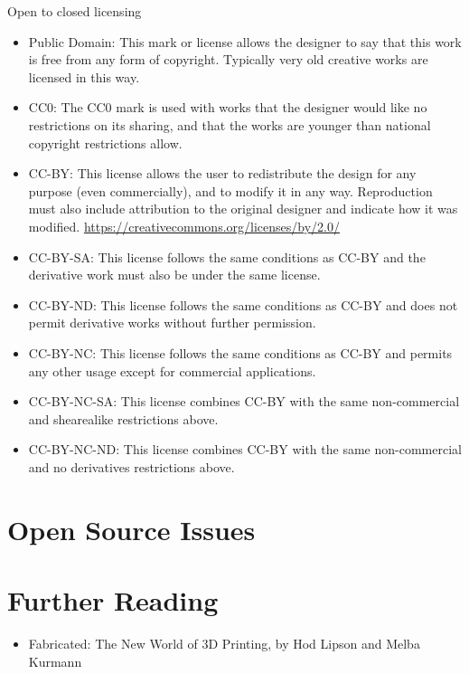 Open to closed licensing
\begin{itemize}
 \item Public Domain: This mark or license allows the designer to say that this work is free from any form of copyright. Typically very old creative works are licensed in this way.  
 \item CC0: The CC0 mark is used with works that the designer would like no restrictions on its sharing, and that the works are younger than national copyright restrictions allow. 
 \item CC-BY: This license allows the user to redistribute the design for any purpose (even commercially), and to modify it in any way. Reproduction must also include attribution to the original designer and indicate how it was modified.  \url{https://creativecommons.org/licenses/by/2.0/}
 \item CC-BY-SA: This license follows the same conditions as CC-BY and the derivative work must also be under the same license. 
 \item CC-BY-ND: This license follows the same conditions as CC-BY and does not permit derivative works without further permission. 
 \item CC-BY-NC: This license follows the same conditions as CC-BY and permits any other usage except for commercial applications. 
 \item CC-BY-NC-SA: This license combines CC-BY with the same non-commercial and shearealike restrictions above. 
 \item CC-BY-NC-ND: This license combines CC-BY with the same non-commercial and no derivatives restrictions above. 
\end{itemize}

\section{Open Source Issues}

\section{Further Reading}

\begin{itemize}
 \item Fabricated: The New World of 3D Printing, by Hod Lipson and Melba Kurmann
\end{itemize}


% 

